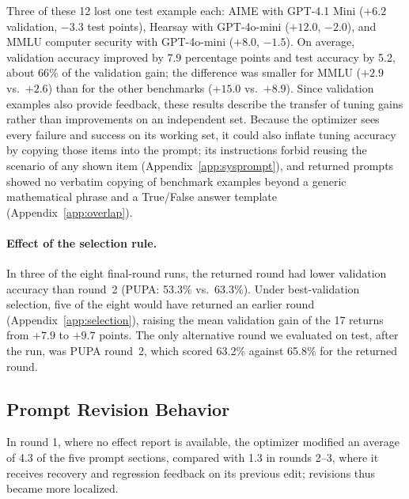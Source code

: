 \documentclass[11pt]{article}
\begin{document}
Three of these 12 lost one test example each: AIME with GPT-4.1 Mini ($+6.2$ validation, $-3.3$ test points), Hearsay with GPT-4o-mini ($+12.0$, $-2.0$), and MMLU computer security with GPT-4o-mini ($+8.0$, $-1.5$). On average, validation accuracy improved by 7.9 percentage points and test accuracy by 5.2, about 66\% of the validation gain; the difference was smaller for MMLU ($+2.9$ vs.\ $+2.6$) than for the other benchmarks ($+15.0$ vs.\ $+8.9$). Since validation examples also provide feedback, these results describe the transfer of tuning gains rather than improvements on an independent set. Because the optimizer sees every failure and success on its working set, it could also inflate tuning accuracy by copying those items into the prompt; its instructions forbid reusing the scenario of any shown item (Appendix~\ref{app:sysprompt}), and returned prompts showed no verbatim copying of benchmark examples beyond a generic mathematical phrase and a True/False answer template (Appendix~\ref{app:overlap}).

\paragraph{Effect of the selection rule.}
In three of the eight final-round runs, the returned round had lower validation accuracy than round~2 (PUPA: 53.3\% vs.\ 63.3\%). Under best-validation selection, five of the eight would have returned an earlier round (Appendix~\ref{app:selection}), raising the mean validation gain of the 17 returns from $+7.9$ to $+9.7$ points. The only alternative round we evaluated on test, after the run, was PUPA round~2, which scored 63.2\% against 65.8\% for the returned round.

\subsection{Prompt Revision Behavior}
\label{sec:edits}

In round 1, where no effect report is available, the optimizer modified an average of 4.3 of the five prompt sections, compared with 1.3 in rounds 2--3, where it receives recovery and regression feedback on its previous edit; revisions thus became more localized.

\end{document}
